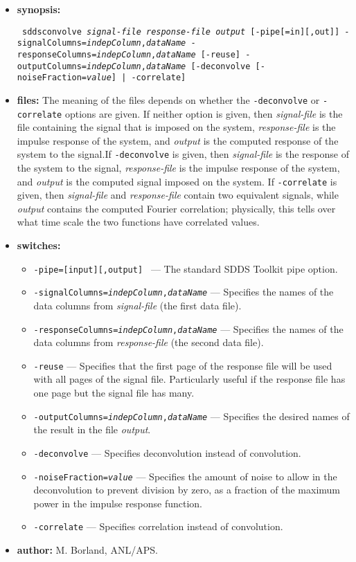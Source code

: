 \begin{itemize}
\item {\bf synopsis:}
\begin{flushleft}{\tt
sddsconvolve  {\em signal-file} {\em response-file} {\em output} [-pipe[=in][,out]]
 -signalColumns={\em indepColumn},{\em dataName}
 -responseColumns={\em indepColumn},{\em dataName} [-reuse]
 -outputColumns={\em indepColumn},{\em dataName}  
[{-deconvolve [-noiseFraction={\em value}] | -correlate}]
}\end{flushleft}
\item {\bf files:}
The meaning of the files depends on whether the {\tt -deconvolve} or {\tt -correlate}
options are given.
If neither option is given, then
{\em signal-file} is the file containing the signal that is imposed on the system,
{\em response-file} is the impulse response of the system, and 
{\em output} is the computed response of the system to the signal.If {\tt -deconvolve} is given, then {\em signal-file} is the response of the
system to the signal, {\em response-file} is the impulse response of the system, and
{\em output} is the computed signal imposed on the system.
If {\tt -correlate} is given, then {\em signal-file} and {\em response-file} contain
two equivalent signals, while {\em output} contains the computed Fourier correlation;
physically, this tells over what time scale the two functions have correlated values.
\item {\bf switches:}
    \begin{itemize}
    \item {\tt -pipe=[input][,output] } --- The standard SDDS Toolkit pipe option.
        \item {\tt -signalColumns={\em indepColumn},{\em dataName}} --- Specifies the
        names of the data columns from {\em signal-file} (the first data file).
        \item {\tt -responseColumns={\em indepColumn},{\em dataName}} --- Specifies the
        names of the data columns from {\em response-file} (the second data file).
        \item {\tt -reuse} --- Specifies that the first page of the response file will
          be used with all pages of the signal file. Particularly useful if the
          response file has one page but the signal file has many.
        \item {\tt -outputColumns={\em indepColumn},{\em dataName}} --- Specifies the
        desired names of the result in the file {\em output}.
        \item {\tt -deconvolve} --- Specifies deconvolution instead of convolution.
        \item {\tt -noiseFraction={\em value}} --- Specifies the amount of noise to
        allow in the deconvolution to prevent division by zero, as a fraction of the
        maximum power in the impulse response function.
        \item {\tt -correlate} --- Specifies correlation instead of convolution.
    \end{itemize}
\item {\bf author:} M. Borland, ANL/APS.
\end{itemize}


